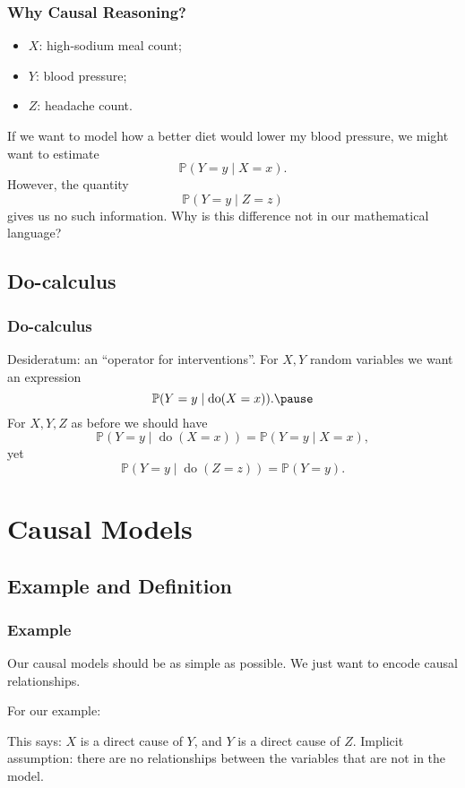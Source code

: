 \documentclass{beamer}
\renewcommand{\P}{\mathbb{P}}
\DeclareMathOperator{\Do}{do}
\begin{document}
\begin{frame}
    \frametitle{Why Causal Reasoning?}
    \begin{itemize}
        \item $X$: high-sodium meal count;
        \item $Y$: blood pressure;
        \item $Z$: headache count.\pause
    \end{itemize}
    If we want to model how a better diet would lower my blood pressure, we
    might want to estimate
    \[
        \P(Y = y \mid X = x).
    \]
    However, the quantity
    \[
        \P(Y = y \mid Z = z)
    \]
    gives us no such information. Why is this difference not in our
    mathematical language?
\end{frame}

\subsection{Do-calculus}
\begin{frame}
    \frametitle{Do-calculus}
    Desideratum: an ``operator for interventions''. For $X, Y$ random variables
    we want an expression
    \[
        \P(Y = y \mid \Do(X = x)).\pause
    \]
    For $X, Y, Z$ as before we should have
    \[
        \P(Y = y \mid \Do(X = x)) = \P(Y = y \mid X = x),
    \]
    yet
    \[
        \P(Y = y \mid \Do(Z = z)) = \P(Y = y).
    \]
\end{frame}

\section{Causal Models}
\subsection{Example and Definition}
\begin{frame}
    \frametitle{Example}
    Our causal models should be as simple as possible. We just want to encode
    causal relationships.\pause\bigskip
    
    For our example:
    \begin{center}
    \end{center}\pause
    This says: $X$ is a direct cause of $Y$, and $Y$ is a direct cause of
    $Z$. \pause \alert{Implicit assumption}: there are no relationships between the
    variables that are not in the model.
\end{frame}
\end{document}
